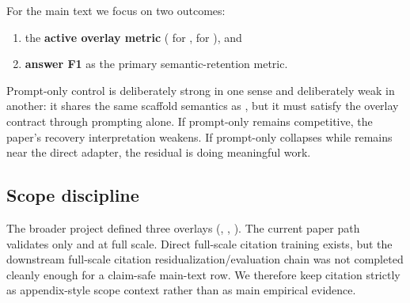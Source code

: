 For the main text we focus on two outcomes:
\begin{enumerate}[leftmargin=1.5em]
    \item the \textbf{active overlay metric} (\jsonmetric{} for , \quotemetric{} for ), and
    \item \textbf{answer F1} as the primary semantic-retention metric.
\end{enumerate}
Prompt-only control is deliberately strong in one sense and deliberately weak in another: it shares the same scaffold semantics as \method{}, but it must satisfy the overlay contract through prompting alone. If prompt-only remains competitive, the paper's recovery interpretation weakens. If prompt-only collapses while \method{} remains near the direct adapter, the residual is doing meaningful work.

\subsection{Scope discipline}

The broader project defined three overlays (, , ). The current paper path validates only  and  at full scale. Direct full-scale citation training exists, but the downstream full-scale citation residualization/evaluation chain was not completed cleanly enough for a claim-safe main-text row. We therefore keep citation strictly as appendix-style scope context rather than as main empirical evidence.
